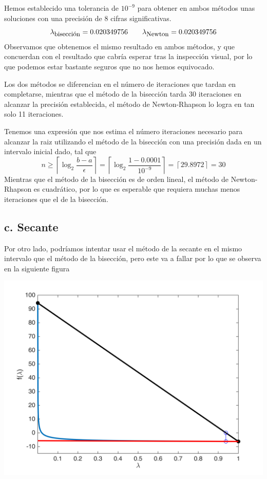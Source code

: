 \documentclass{article}
\begin{document}
Hemos establecido una tolerancia de $10^{-9}$ para obtener en ambos métodos unas soluciones con una precisión de 8 cifras significativas.
\[\lambda_{\mbox{\small bisección}} = 0.020349756 \ \ \ \ \ \ \lambda_{\mbox{\small Newton}} = 0.020349756\]
Observamos que obtenemos el mismo resultado en ambos métodos, y que concuerdan con el resultado que cabría esperar tras la inspección visual, por lo que podemos estar bastante seguros que no nos hemos equivocado.

Los dos métodos se diferencian en el número de iteraciones que tardan en completarse, mientras que el método de la bisección tarda 30 iteraciones en alcanzar la precisión establecida, el método de Newton-Rhapson lo logra en tan solo 11 iteraciones.

Tenemos una expresión que nos estima el número iteraciones necesario para alcanzar la raiz utilizando el método de la bisección con una precisión dada en un intervalo inicial dado, tal que 
\[n \geq \left\lceil \log_2{\frac{b-a}{\epsilon}}\right\rceil = \left\lceil \log_2{\frac{1-0.0001}{10^{-9}}}\right\rceil =\left\lceil 29.8972\right\rceil =  30\]
Mientras que el método de la bisección es de orden lineal, el método de Newton-Rhapson es cuadrático, por lo que es esperable que requiera muchas menos iteraciones que el de la bisección.

\subsection*{c. Secante}
Por otro lado, podríamos intentar usar el método de la secante en el mismo intervalo que el método de la bisección, pero este va a fallar por lo que se observa en la siguiente figura

\includegraphics{untitled.png}
\end{document}
